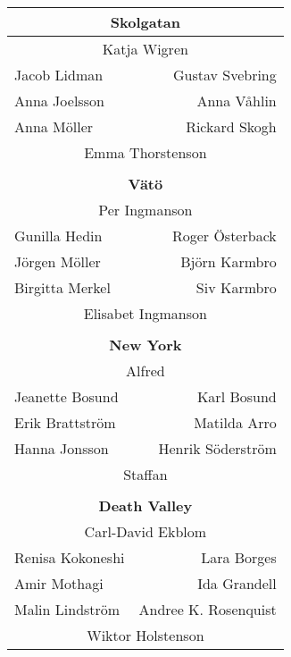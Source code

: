 \documentclass[a5paper]{article}
\begin{document}
\begin{landscape}
\begin{center}
\begin{tabular}{  l r }
			\multicolumn{2}{c}{\textbf{Skolgatan			}} \\ \hline								
			\multicolumn{2}{c}{\rule{0pt}{2ex}	Katja Wigren			}   \\								
			Jacob Lidman	&	Gustav Svebring	\\								
			Anna Joelsson	&	Anna Våhlin	\\								
			Anna Möller	&	Rickard Skogh	\\								
			\multicolumn{2}{c}{	Emma Thorstenson			}   \\								
			\\								
			
			\multicolumn{2}{c}{\textbf{Vätö			}} \\ \hline								
			\multicolumn{2}{c}{\rule{0pt}{2ex}	Per Ingmanson			}   \\								
			Gunilla Hedin	&	Roger Österback	\\								
			Jörgen Möller	&	Björn Karmbro	\\								
			Birgitta Merkel	&	Siv Karmbro	\\								
			\multicolumn{2}{c}{	Elisabet Ingmanson			}   \\								
			\\								
			
			\multicolumn{2}{c}{\textbf{New York			}} \\ \hline								
			\multicolumn{2}{c}{\rule{0pt}{2ex}	Alfred			}   \\								
			Jeanette Bosund	&	Karl Bosund	\\								
			Erik Brattström	&	Matilda Arro	\\								
			Hanna Jonsson	&	Henrik Söderström	\\								
			\multicolumn{2}{c}{	Staffan			}   \\								
			\\								
			
			\multicolumn{2}{c}{\textbf{Death Valley			}} \\ \hline								
			\multicolumn{2}{c}{\rule{0pt}{2ex} Carl-David Ekblom			}   \\								
			Renisa Kokoneshi	&	Lara Borges	\\								
			Amir Mothagi	&	Ida Grandell	\\								
			Malin Lindström	&	Andree K. Rosenquist	\\								
			\multicolumn{2}{c}{	Wiktor Holstenson			}   \\								
			
		\end{tabular}												
	\end{center}															

	\end{landscape}
	\endgroup
	
	
	
\end{document}
